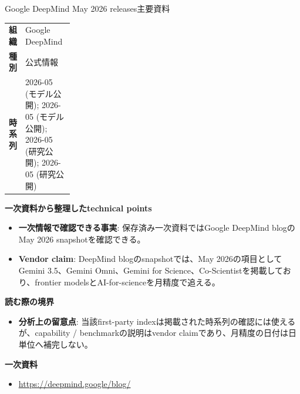 \begin{technicalnote}{Google DeepMind May 2026 releases}{主要資料}
\begingroup
\begin{tabularx}{\linewidth}{@{}>{\bfseries}p{0.22\linewidth}X@{}}
組織 & Google DeepMind \\
種別 & 公式情報 \\
時系列 & 2026-05 (モデル公開); 2026-05 (モデル公開); 2026-05 (研究公開); 2026-05 (研究公開) \\
\end{tabularx}
\smallskip
{\bfseries 一次資料から整理したtechnical points}
\begin{itemize}[leftmargin=1.5em,itemsep=0.35em]
\item \textbf{一次情報で確認できる事実}: 保存済み一次資料ではGoogle DeepMind blogのMay 2026 snapshotを確認できる。
\end{itemize}
\begin{minipage}{\linewidth}
\begin{itemize}[leftmargin=1.5em,itemsep=0.35em]
\item \textbf{Vendor claim}: DeepMind blogのsnapshotでは、May 2026の項目としてGemini 3.5、Gemini Omni、Gemini for Science、Co-Scientistを掲載しており、frontier modelsとAI-for-scienceを月精度で追える。
\end{itemize}
{\bfseries 読む際の境界}
\begin{itemize}[leftmargin=1.5em,itemsep=0.35em]
\item \textbf{分析上の留意点}: 当該first-party indexは掲載された時系列の確認には使えるが、capability / benchmarkの説明はvendor claimであり、月精度の日付は日単位へ補完しない。
\end{itemize}
\begin{samepage}
{\bfseries 一次資料}
\begingroup\sloppy
\begin{itemize}[leftmargin=1.5em,itemsep=0.25em]
\item {\scriptsize\url{https://deepmind.google/blog/}}
\end{itemize}
\endgroup
\end{samepage}
\end{minipage}
\endgroup
\end{technicalnote}
\medskip

